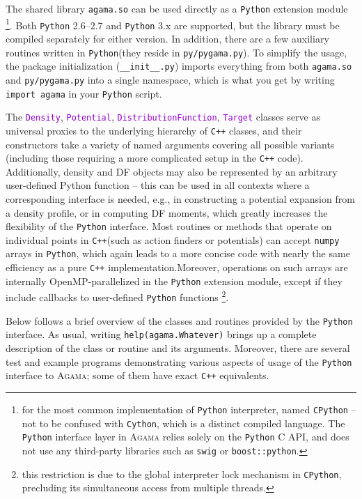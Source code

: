 \documentclass[12pt]{article}
\newcommand{\Agama}{\textsc{Agama}\xspace}
\newcommand{\Cpp}  {\texttt{C++}\xspace}
\newcommand{\Python}{\texttt{Python}\xspace}
\newcommand{\ttt}[1]{\textcolor{darkviolet}{\texttt{#1}}}
\begin{document}
The shared library \texttt{agama.so} can be used directly as a \Python extension module%
\footnote{for the most common implementation of \Python interpreter, named \texttt{CPython} -- not to be confused with \texttt{Cython}, which is a distinct compiled language. The \Python interface layer in \Agama relies solely on the \Python C API, and does not use any third-party libraries such as \texttt{swig} or \texttt{boost::python}.}. Both \Python 2.6--2.7 and \Python 3.x are supported, but the library must be compiled separately for either version. In addition, there are a few auxiliary routines written in \Python (they reside in \texttt{py/pygama.py}). To simplify the usage, the package initialization (\texttt{__init__.py}) imports everything from both \texttt{agama.so} and \texttt{py/pygama.py} into a single namespace, which is what you get by writing \texttt{import agama} in your \Python script.

The \ttt{Density}, \ttt{Potential}, \ttt{DistributionFunction}, \ttt{Target} classes serve as universal proxies to the underlying hierarchy of \Cpp classes, and their constructors take a variety of named arguments covering all possible variants (including those requiring a more complicated setup in the \Cpp code).
Additionally, density and DF objects may also be represented by an arbitrary user-defined Python function -- this can be used in all contexts where a corresponding interface is needed, e.g., in constructing a potential expansion from a density profile, or in computing DF moments, which greatly increases the flexibility of the \Python interface. Most routines or methods that operate on individual points in \Cpp (such as action finders or potentials) can accept \texttt{numpy} arrays in \Python, which again leads to a more concise code with nearly the same efficiency as a pure \Cpp implementation.Moreover, operations on such arrays are internally OpenMP-parallelized in the \Python extension module, except if they include callbacks to user-defined \Python functions%
\footnote{this restriction is due to the global interpreter lock mechanism in \texttt{CPython}, precluding its simultaneous access from multiple threads.}.

Below follows a brief overview of the classes and routines provided by the \Python interface.
As usual, writing \texttt{help(agama.Whatever)} brings up a complete description of the class or routine and its arguments. Moreover, there are several test and example programs demonstrating various aspects of usage of the \Python interface to \Agama; some of them have exact \Cpp equivalents.
\end{document}
